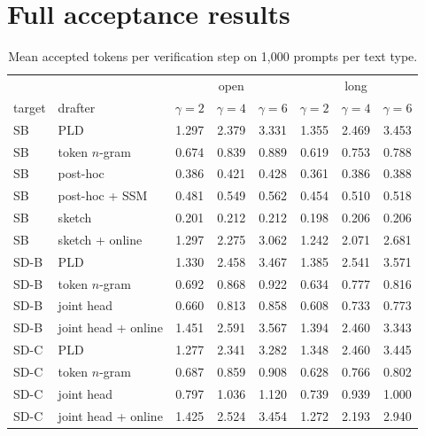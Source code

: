 \documentclass[11pt]{article}
\newcommand{\SB}{\textsc{SB}}
\newcommand{\SDB}{\textsc{SD-B}}
\newcommand{\SDC}{\textsc{SD-C}}
\newcommand{\PLD}{\textsc{PLD}}
\begin{document}
\section{Full acceptance results}
\label{app:accept}

\begin{table}[t]
\centering
\small
\setlength{\tabcolsep}{3pt}
\begin{tabular}{llcccccc}
\toprule
 & & \multicolumn{3}{c}{open} & \multicolumn{3}{c}{long} \\
target & drafter & $\gamma{=}2$ & $\gamma{=}4$ & $\gamma{=}6$ & $\gamma{=}2$ & $\gamma{=}4$ & $\gamma{=}6$ \\
\midrule
\SB & \PLD & 1.297 & 2.379 & 3.331 & 1.355 & 2.469 & 3.453 \\
\SB & token $n$-gram & 0.674 & 0.839 & 0.889 & 0.619 & 0.753 & 0.788 \\
\SB & post-hoc & 0.386 & 0.421 & 0.428 & 0.361 & 0.386 & 0.388 \\
\SB & post-hoc + SSM & 0.481 & 0.549 & 0.562 & 0.454 & 0.510 & 0.518 \\
\SB & sketch & 0.201 & 0.212 & 0.212 & 0.198 & 0.206 & 0.206 \\
\SB & sketch + online & 1.297 & 2.275 & 3.062 & 1.242 & 2.071 & 2.681 \\
\SDB & \PLD & 1.330 & 2.458 & 3.467 & 1.385 & 2.541 & 3.571 \\
\SDB & token $n$-gram & 0.692 & 0.868 & 0.922 & 0.634 & 0.777 & 0.816 \\
\SDB & joint head & 0.660 & 0.813 & 0.858 & 0.608 & 0.733 & 0.773 \\
\SDB & joint head + online & 1.451 & 2.591 & 3.567 & 1.394 & 2.460 & 3.343 \\
\SDC & \PLD & 1.277 & 2.341 & 3.282 & 1.348 & 2.460 & 3.445 \\
\SDC & token $n$-gram & 0.687 & 0.859 & 0.908 & 0.628 & 0.766 & 0.802 \\
\SDC & joint head & 0.797 & 1.036 & 1.120 & 0.739 & 0.939 & 1.000 \\
\SDC & joint head + online & 1.425 & 2.524 & 3.454 & 1.272 & 2.193 & 2.940 \\
\bottomrule
\end{tabular}
\caption{Mean accepted tokens per verification step on 1{,}000 prompts per text type.}
\end{table}

\end{document}
